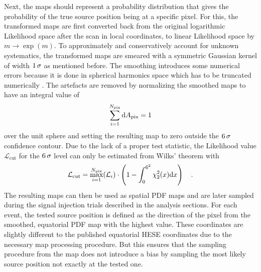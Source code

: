 Next, the maps should represent a probability distribution that gives the probability of the true source position being at a specific pixel.
For this, the transformed maps are first converted back from the original logarithmic Likelihood space after the scan in local coordinates, to linear Likelihood space by $m\rightarrow \exp{(m)}$.
To approximately and conservatively account for unknown systematics, the transformed maps are smeared with a symmetric Gaussian kernel of width $\num{1}\,\sigma$ as mentioned before.
The smoothing introduces some numerical errors because it is done in spherical harmonics space which has to be truncated numerically .
The artefacts are removed by normalizing the smoothed maps to have an integral value of
\begin{equation}
  \sum_{i=1}^{N_\text{pix}} \mathrm{d}A_\text{pix} = 1
\end{equation}
over the unit sphere and setting the resulting map to zero outside the $\num{6}\,\sigma$ confidence contour.
Due to the lack of a proper test statistic, the Likelihood value $\mathcal{L}_\text{cut}$ for the $\num{6}\,\sigma$ level can only be estimated from Wilks' theorem with
\begin{equation}
  \mathcal{L}_\text{cut} =
    \max_{i=1}^{N_\text{pix}}(\mathcal{L}_i)\cdot
    \left(1 - \int_0^{6^2}\chi^2_{2}(x)\mathrm{d}x\right)
  \quad\text{.}
\end{equation}
The resulting maps can then be used as spatial PDF maps and are later sampled during the signal injection trials described in the analysis sections.
For each event, the tested source position is defined as the direction of the pixel from the smoothed, equatorial PDF map with the highest value.
These coordinates are slightly different to the published equatorial HESE coordinates due to the necessary map processing procedure.
But this ensures that the sampling procedure from the map does not introduce a bias by sampling the most likely source position not exactly at the tested one.

